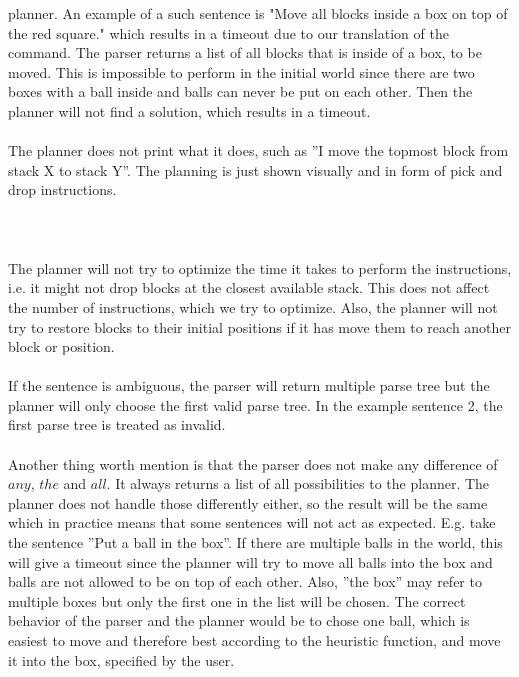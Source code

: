 planner. An example of a such sentence is "Move all blocks inside a box on top
of the red square." which results in a timeout due to our translation of the
command. The parser returns a list of all blocks that is inside of a box, to be
moved. This is impossible to perform in the initial world since there are two
boxes with a ball inside and balls can never be put on each other. Then the
planner will not find a solution, which results in a timeout.\\\\
The planner does not print what it does, such as ''I move the topmost block
from stack X to stack Y''. The planning is just shown visually and in form of
pick and drop instructions. \\\\\\\\
The planner will not try to optimize the time it takes to perform the
instructions, i.e. it might not drop blocks at the closest available stack.
This does not affect the number of instructions, which we try to optimize.
Also, the planner will not try to restore blocks to their initial positions if
it has move them to reach another block or position. 
\\\\
If the sentence is ambiguous, the parser will return multiple parse tree but
the planner will only choose the first valid parse tree. In the example
sentence 2, the first parse tree is treated as invalid. 
\\\\
Another thing worth mention is that the parser does not make any difference of
$any$, $the$ and $all$. It always returns a list of all possibilities to the
planner. The planner does not handle those differently either, so the result will be 
the same which in practice means that some sentences will not act as expected. E.g. 
take the sentence ''Put a ball in the box''. If there are multiple balls in the world, 
this will give a timeout since the planner will try to move all balls into the box and 
balls are not allowed to be on top of each other. Also, ''the box'' may refer to 
multiple boxes but only the first one in the list will be chosen. The correct behavior of 
the parser and the planner would be to chose one ball, which is easiest to move and therefore 
best according to the heuristic function, and move it into the box, specified 
by the user. 
